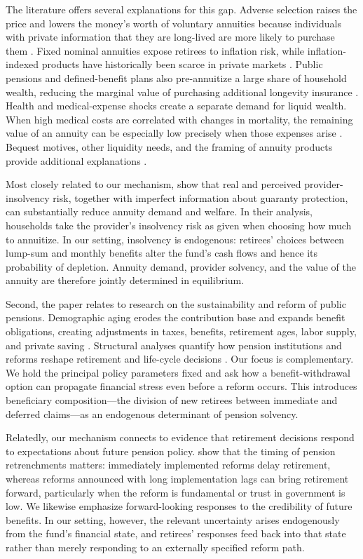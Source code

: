 \documentclass[a4paper, 12pt]{article}
\begin{document}
The literature offers several explanations for this gap. Adverse selection
raises the price and lowers the money's worth of voluntary annuities because
individuals with private information that they are long-lived are more likely to
purchase them \citep{finkelstein2002}. Fixed nominal annuities expose retirees to
inflation risk, while inflation-indexed products have historically been scarce
in private markets \citep{brown2002inflation}. Public pensions and
defined-benefit plans also pre-annuitize a large share of household wealth,
reducing the marginal value of purchasing additional longevity insurance
\citep{dushi2004}. Health and medical-expense shocks create a separate demand for
liquid wealth. When high medical costs are correlated with changes in mortality,
the remaining value of an annuity can be especially low precisely when those
expenses arise \citep{reichling2015}. Bequest motives, other liquidity needs, and
the framing of annuity products provide additional explanations
\citep{brown2008}.

Most closely related to our mechanism, \citet{hui2021} show that real and
perceived provider-insolvency risk, together with imperfect information about
guaranty protection, can substantially reduce annuity demand and welfare. In
their analysis, households take the provider's insolvency risk as given when
choosing how much to annuitize. In our setting, insolvency is endogenous:
retirees' choices between lump-sum and monthly benefits alter the fund's cash
flows and hence its probability of depletion. Annuity demand, provider solvency,
and the value of the annuity are therefore jointly determined in equilibrium.

Second, the paper relates to research on the sustainability and reform of public
pensions. Demographic aging erodes the contribution base and expands benefit
obligations, creating adjustments in taxes, benefits, retirement ages, labor
supply, and private saving \citep{attanasio2007,boerschsupan2016}. Structural
analyses quantify how pension institutions and reforms reshape retirement and
life-cycle decisions \citep{french2011,kitao2018,daminato2024,delalibera2026}.
Our focus is complementary. We hold the principal policy parameters fixed and
ask how a benefit-withdrawal option can propagate financial stress even before a
reform occurs. This introduces beneficiary composition---the division of new
retirees between immediate and deferred claims---as an endogenous determinant of
pension solvency.

Relatedly, our mechanism connects to evidence that retirement decisions respond
to expectations about future pension policy. \citet{huixin2023} show that the
timing of pension retrenchments matters: immediately implemented reforms delay
retirement, whereas reforms announced with long implementation lags can bring
retirement forward, particularly when the reform is fundamental or trust in
government is low. We likewise emphasize forward-looking responses to the
credibility of future benefits. In our setting, however, the relevant uncertainty
arises endogenously from the fund's financial state, and retirees' responses feed
back into that state rather than merely responding to an externally specified
reform path.
\end{document}
